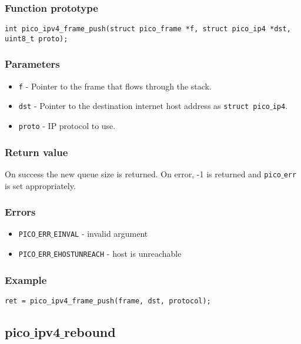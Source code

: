 \subsubsection*{Function prototype}
\begin{verbatim}
int pico_ipv4_frame_push(struct pico_frame *f, struct pico_ip4 *dst, uint8_t proto);
\end{verbatim}

\subsubsection*{Parameters}
\begin{itemize}[noitemsep]
\item \texttt{f} - Pointer to the frame that flows through the stack.
\item \texttt{dst} - Pointer to the destination internet host address as \texttt{struct pico$\_$ip4}.
\item \texttt{proto} - IP protocol to use. 
\end{itemize}

\subsubsection*{Return value}
On success the new queue size is returned.
On error, -1 is returned and \texttt{pico$\_$err} is set appropriately.

\subsubsection*{Errors}
\begin{itemize}[noitemsep]
\item \texttt{PICO$\_$ERR$\_$EINVAL} - invalid argument
\item \texttt{PICO$\_$ERR$\_$EHOSTUNREACH} - host is unreachable
\end{itemize}

\subsubsection*{Example}
\begin{verbatim}
ret = pico_ipv4_frame_push(frame, dst, protocol);
\end{verbatim}


\subsection{pico$\_$ipv4$\_$rebound}


